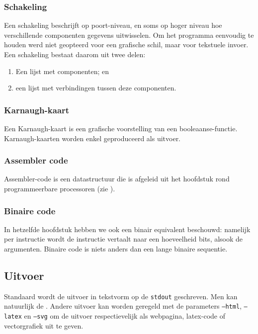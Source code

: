 \subsubsection{Schakeling}
Een schakeling beschrijft op poort-niveau, en soms op hoger niveau hoe verschillende componenten gegevens uitwisselen. Om het programma eenvoudig te houden werd niet geopteerd voor een grafische schil, maar voor tekstuele invoer. Een schakeling bestaat daarom uit twee delen:
\begin{enumerate}
 \item Een lijst met componenten; en
 \item een lijst met verbindingen tussen deze componenten.
\end{enumerate}

\subsubsection{Karnaugh-kaart}
Een Karnaugh-kaart is een grafische voorstelling van een booleaanse-functie. Karnaugh-kaarten worden enkel geproduceerd als uitvoer.
\subsubsection{Assembler code}
Assembler-code is een datastructuur die is afgeleid uit het hoofdstuk rond programmeerbare processoren (zie ).
\subsubsection{Binaire code}
In hetzelfde hoofdstuk hebben we ook een binair equivalent beschouwd: namelijk per instructie wordt de instructie vertaalt naar een hoeveelheid bits, alsook de argumenten. Binaire code is niets anders dan een lange binaire sequentie.

\subsection{Uitvoer}
Standaard wordt de uitvoer in tekstvorm op de \texttt{stdout} geschreven. Men kan natuurlijk de . Andere uitvoer kan worden geregeld met de parameters \texttt{--html}, \texttt{--latex} en \texttt{--svg} om de uitvoer respectievelijk als webpagina, latex-code of vectorgrafiek uit te geven.

